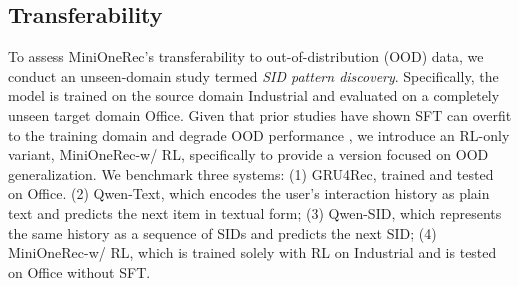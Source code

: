 
\subsection{Transferability}
\label{subsec: Transferability}

To assess MiniOneRec's transferability to out-of-distribution (OOD) data, we conduct an unseen-domain study termed \emph{SID pattern discovery}. 
Specifically, the model is trained on the source domain Industrial and evaluated on a completely unseen target domain Office. Given that prior studies have shown SFT can overfit to the training domain and degrade OOD performance \citep{RLvsSFT, RLReallyLearn, SFT-then-RL, RevisitingRL}, we introduce an RL-only variant, MiniOneRec-w/ RL, specifically to provide a version focused on OOD generalization. We benchmark three systems:  
(1) GRU4Rec, trained and tested on Office.
(2) Qwen-Text, which encodes the user’s interaction history as plain text and predicts the next item in textual form;  
(3) Qwen-SID, which represents the same history as a sequence of SIDs and predicts the next SID;  
(4) MiniOneRec-w/ RL, which is trained solely with RL on Industrial and is tested on Office without SFT.  

